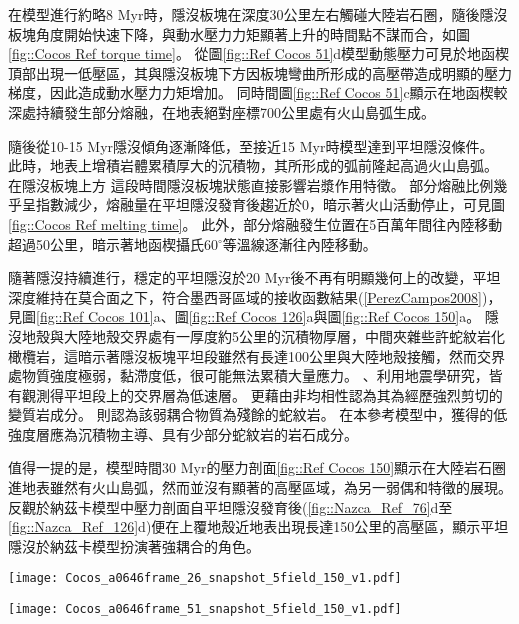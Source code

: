 在模型進行約略8 Myr時，隱沒板塊在深度30公里左右觸碰大陸岩石圈，隨後隱沒板塊角度開始快速下降，與動水壓力力矩顯著上升的時間點不謀而合，如圖\ref{fig::Cocos Ref torque time}。
從圖\ref{fig::Ref Cocos 51}d模型動態壓力可見於地函楔頂部出現一低壓區，其與隱沒板塊下方因板塊彎曲所形成的高壓帶造成明顯的壓力梯度，因此造成動水壓力力矩增加。
同時間圖\ref{fig::Ref Cocos 51}c顯示在地函楔較深處持續發生部分熔融，在地表絕對座標700公里處有火山島弧生成。

隨後從10-15 Myr隱沒傾角逐漸降低，至接近15 Myr時模型達到平坦隱沒條件。
此時，地表上增積岩體累積厚大的沉積物，其所形成的弧前隆起高過火山島弧。
在隱沒板塊上方
這段時間隱沒板塊狀態直接影響岩漿作用特徵。
部分熔融比例幾乎呈指數減少，熔融量在平坦隱沒發育後趨近於0，暗示著火山活動停止，可見圖\ref{fig::Cocos Ref melting time}。
此外，部分熔融發生位置在5百萬年間往內陸移動超過50公里，暗示著地函楔攝氏60$^{\circ}$等溫線逐漸往內陸移動。

隨著隱沒持續進行，穩定的平坦隱沒於20 Myr後不再有明顯幾何上的改變，平坦深度維持在莫合面之下，符合墨西哥區域的接收函數結果(\ref{PerezCampos2008})，見圖\ref{fig::Ref Cocos 101}a、圖\ref{fig::Ref Cocos 126}a與圖\ref{fig::Ref Cocos 150}a。
隱沒地殼與大陸地殼交界處有一厚度約5公里的沉積物厚層，中間夾雜些許蛇紋岩化橄欖岩，這暗示著隱沒板塊平坦段雖然有長達100公里與大陸地殼接觸，然而交界處物質強度極弱，黏滯度低，很可能無法累積大量應力。
\citealp{Song2009}、\citealp{Song2012SC}利用地震學研究，皆有觀測得平坦段上的交界層為低速層。
\citealp{Song2012SC}更藉由非均相性認為其為經歷強烈剪切的變質岩成分。
\citealp{Manea2017}則認為該弱耦合物質為殘餘的蛇紋岩。
在本參考模型中，獲得的低強度層應為沉積物主導、具有少部分蛇紋岩的岩石成分。

值得一提的是，模型時間30 Myr的壓力剖面\ref{fig::Ref Cocos 150}顯示在大陸岩石圈進地表雖然有火山島弧，然而並沒有顯著的高壓區域，為另一弱偶和特徵的展現。
反觀於納茲卡模型中壓力剖面自平坦隱沒發育後(\ref{fig::Nazca_Ref_76}d至\ref{fig::Nazca_Ref_126}d)便在上覆地殼近地表出現長達150公里的高壓區，顯示平坦隱沒於納茲卡模型扮演著強耦合的角色。



\begin{figure*}[htp]
    \centering
    \texttt{[image: Cocos\_a0646frame\_26\_snapshot\_5field\_150\_v1.pdf]}
    \caption[科克斯參考模型於5 Myr時之結果]{科克斯參考模型於5 Myr時之結果。}
    \label{fig::Ref Cocos 26}
\end{figure*}

\begin{figure*}[htp]
    \centering
    \texttt{[image: Cocos\_a0646frame\_51\_snapshot\_5field\_150\_v1.pdf]}
    \caption[科克斯參考模型於10 Myr時之結果]{科克斯參考模型於10 Myr時之結果。}
    \label{fig::Ref Cocos 51}
\end{figure*}

